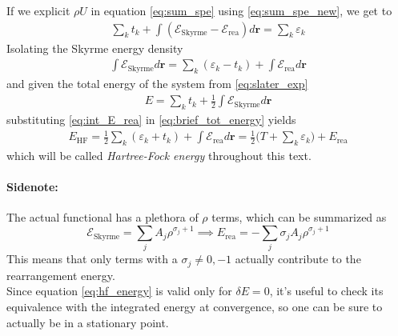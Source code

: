 If we explicit $\rho U$ in equation \ref{eq:sum_spe} using \ref{eq:sum_spe_new}, we get to
\begin{align*}
    \sum_k t_k + \int (\mathcal E_\text{Skyrme}-\mathcal E_\text{rea}) d\bm r = \sum_k \varepsilon_k 
\end{align*}
Isolating the Skyrme energy density
\begin{align}
    \label{eq:int_E_rea}
    \int \mathcal E_\text{Skyrme} d\bm r = \sum_k (\varepsilon_k -t_k) + \int \mathcal E_\text{rea} d\bm r
\end{align}
and given the total energy of the system from \ref{eq:slater_exp}
\begin{align}
    \label{eq:brief_tot_energy}
E=\sum_k t_k + \frac 1 2 \int \mathcal E_\text{Skyrme} d\bm r 
\end{align}
substituting \ref{eq:int_E_rea} in \ref{eq:brief_tot_energy} yields
\begin{align}
    \label{eq:hf_energy}
E_\text{HF} = \frac 1 2 \sum_k (\varepsilon_k + t_k) +\int \mathcal E_\text{rea} d\bm r = \frac 1 2 \bigg(T+\sum_k\varepsilon_k\bigg) +E_\text{rea}
\end{align}
which will be called \textit{Hartree-Fock energy} throughout this text.
\paragraph{Sidenote:}
The actual functional has a plethora of $\rho$ terms, which can be summarized as
\begin{equation*}
    \mathcal E_\text{Skyrme} = \sum_j A_j \rho^{\sigma_j+1} \implies E_\text{rea} = -\sum_j \sigma_j A_j \rho^{\sigma_j+1} 
\end{equation*}
This means that only terms with a $\sigma_j\neq 0, -1$ actually contribute to the rearrangement energy.
\\Since equation \ref{eq:hf_energy} is valid only for $\delta E = 0$, it's useful to check its equivalence with the integrated energy at convergence, so one can be sure to actually be in a stationary point.